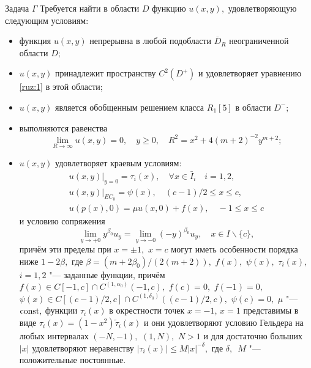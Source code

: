 \begin{newthm}{Задача $\Gamma $} Требуется найти в области $D$ функцию $u(x,y),$ удовлетворяющую следующим условиям\/{\rm :}

\begin{itemize}

\item[\rm 1)] функция $u(x,y)$ непрерывна в любой подобласти ${\bar D_R}$ неограниченной области $D;$

\item[\rm 2)] $u(x,y)$ принадлежит пространству ${C^2}({D^ + })$ и удовлетворяет уравнению \eqref{ruz:1} в этой области\/{\rm ;}

\item[\rm 3)] $u(x,y)$ является обобщенным решением класса ${R_1}[5]$  в области $D^ {- };$

\item[\rm 4)] выполняются равенства
\begin{equation}
\lim\limits_{R \to \infty } u(x,y) = 0, \quad y \ge 0, \quad {R^2} = {x^2} + 4{(m + 2)^{ - 2}}{y^{m + 2}};
\label{ruz:2}
\end{equation}

\item[\rm  5)]  $u(x,y)$ удовлетворяет краевым условиям\/{\rm :}
\begin{gather}
{\left. {u(x,y)} \right|_{y = 0}} = {\tau _i}(x), \quad \forall x \in {\bar I_i} \quad i = 1, 2,
\label{ruz:3}
\\
{\left. {u(x,y)} \right|_{E{C_0}}} = \psi (x), \quad (c - 1)/2 \le x \le c,
\label{ruz:4}
\\
u(p(x), 0)=\mu u(x, 0) + f(x), \quad  - 1 \le x \le c 
\label{ruz:5}
\end{gather}
и условию сопряжения
\begin{equation}
\lim\limits_{y \to+0} {y^{\beta_0}}{u_y}=\lim\limits_{y\to-0}{(-y)^{\beta_0}}{u_y}, \quad x \in I\backslash \{ c\},
\label{ruz:6}
\end{equation}
причём эти пределы при $x = \pm 1,$ $x = c$ могут иметь особенности
порядка ниже $1 - 2\beta,$ где $\beta  = (m + 2{\beta _0})/(2(m + 2)),$
$f(x),$ $\psi (x),$ ${\tau _i}(x),$ $i = 1, 2$ "--- заданные функции,
причём $f(x) \in C[ - 1,c] \cap {C^{(1,{\alpha _0})}}( - 1,c),$
$f(c) = 0,$  $f( - 1) = 0,$ $\psi (x) \in C[(c - 1)/2,c] \cap {C^{(1,{\delta _0})}}((c - 1)/2,c),$
$\psi (c) = 0,$ $\mu$ "--- ${\rm const},$
функции ${\tau _i}(x)$ в окрестности точек $x=-1$,  $x = 1$ представимы в виде
 $\tau _i(x) = (1 - x^2){\tilde \tau _i}(x)$ и они удовлетворяют условию Гельдера на любых интервалах 
  $( - N, - 1),$ $(1,N),$ $N > 1$ и  для  достаточно больших $|x|$
  удовлетворяют неравенству $|\tau_i(x)|\leq M{|x|^{-\delta}},$
  где $\delta,$~$M$ "--- положительные постоянные{\rm .}
  
\end{itemize}
\end{newthm}

